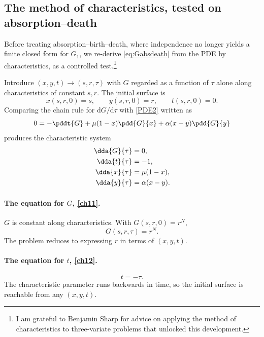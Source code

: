 \subsection{The method of characteristics, tested on absorption--death}
\label{sec:mocabsdeath}

Before treating absorption--birth--death, where independence no longer yields a finite closed form for \(G_1\), we re-derive \cref{eq:Gabsdeath} from the PDE by characteristics, as a controlled test.\footnote{I am grateful to Benjamin Sharp for advice on applying the method of characteristics to three-variate problems that unlocked this development.}

Introduce \((x,y,t)\to(s,r,\tau)\) with \(G\) regarded as a function of \(\tau\) alone along characteristics of constant \(s,r\). The initial surface is
\begin{equation}
\label{ICpar}
x(s,r,0) = s, \qquad y(s,r,0) = r, \qquad t(s,r,0) = 0 .
\end{equation}
Comparing the chain rule for \(\mathrm{d}G/\mathrm{d}\tau\) with \cref{PDE2} written as
\begin{equation*}
0 = -\pddt{G} + \mu(1-x)\pdd{G}{x} + \alpha(x-y)\pdd{G}{y}
\end{equation*}
produces the characteristic system
\begin{align}
\dda{G}{\tau} &= 0, \label{ch11}\\
\dda{t}{\tau} &= -1, \label{ch12}\\
\dda{x}{\tau} &= \mu(1-x), \label{ch13}\\
\dda{y}{\tau} &= \alpha(x-y). \label{ch14}
\end{align}

\paragraph{The equation for \(G\), \eqref{ch11}.}
\(G\) is constant along characteristics. With \(G(s,r,0)=r^N\),
\begin{equation}
\label{GrN}
G(s,r,\tau) = r^N .
\end{equation}
The problem reduces to expressing \(r\) in terms of \((x,y,t)\).

\paragraph{The equation for \(t\), \eqref{ch12}.}
\begin{equation}
\label{minustau}
t = -\tau .
\end{equation}
The characteristic parameter runs backwards in time, so the initial surface is reachable from any \((x,y,t)\).

